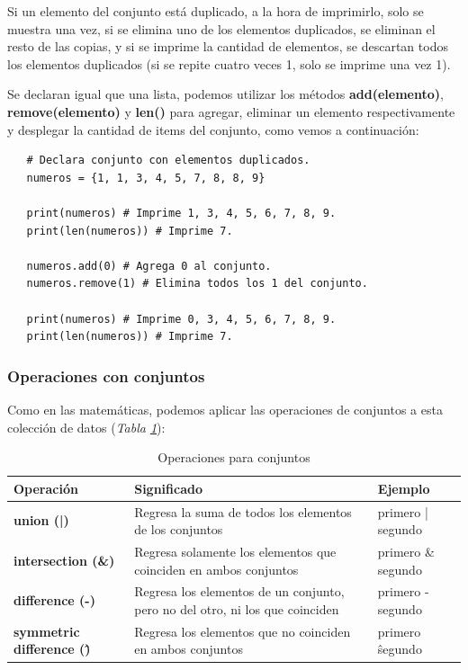 Si un elemento del conjunto está duplicado, a la hora de imprimirlo, solo se muestra una vez, si se elimina uno de los elementos duplicados, se eliminan el resto de las copias, y si se imprime la cantidad de elementos, se descartan todos los elementos duplicados (si se repite cuatro veces 1, solo se imprime una vez 1).

Se declaran igual que una lista, podemos utilizar los métodos \textbf{add(elemento)},  \textbf{remove(elemento)} y \textbf{len()} para agregar, eliminar un elemento respectivamente y desplegar la cantidad de items del conjunto, como vemos a continuación:
\begin{lstlisting}
   # Declara conjunto con elementos duplicados.
   numeros = {1, 1, 3, 4, 5, 7, 8, 8, 9}
   
   print(numeros) # Imprime 1, 3, 4, 5, 6, 7, 8, 9.
   print(len(numeros)) # Imprime 7.
   
   numeros.add(0) # Agrega 0 al conjunto.
   numeros.remove(1) # Elimina todos los 1 del conjunto.
   
   print(numeros) # Imprime 0, 3, 4, 5, 6, 7, 8, 9.
   print(len(numeros)) # Imprime 7.
\end{lstlisting}


\subsubsection{Operaciones con conjuntos}
\hspace{0.55cm}Como en las matemáticas, podemos aplicar las operaciones de conjuntos a esta colección de datos (\textit{Tabla \ref{tab: 9}}):
\begin{table}[H]
    \begin{center}
        \caption{Operaciones para conjuntos}
        \label{tab: 9}
        \begin{tabular}{m{4cm}|m{5cm}|m{3cm}}
            \hline
            \textbf{Operación}&\textbf{Significado}&\textbf{Ejemplo} \\
            \hline
            \textbf{union (|)}					& Regresa la suma de todos los elementos de los conjuntos							& primero | segundo \\
            \textbf{intersection (\&)}			& Regresa solamente los elementos que coinciden en ambos conjuntos				& primero \& segundo \\
            \textbf{difference (-)}				& Regresa los elementos de un conjunto, pero no del otro, ni los que coinciden	& primero - segundo \\
            \textbf{symmetric difference (\^)}	& Regresa los elementos que no coinciden en ambos conjuntos						& primero \^ segundo \\
            \hline
        \end{tabular}
    \end{center}    
\end{table}

